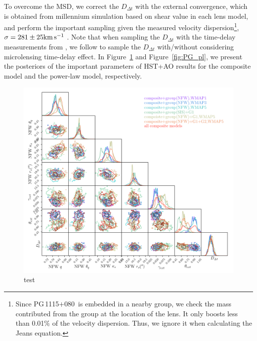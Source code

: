 \documentclass[useAMS,usenatbib]{mnras}
\newcommand\pg{PG\,1115$+$080}
\newcommand{\fref}[1]{Figure~\ref{#1}}
\def\kms {\rm km\,s^{-1}}
\newcommand{\Ddt}{{D_{\Delta t}}}
\begin{document}
To overcome the MSD, we correct the $\Ddt$ with the external convergence, which is obtained from millennium simulation based on shear value in each lens model, and perform the important sampling given the measured velocity dispersion\footnote{Since \pg~is embedded in a nearby group, we check the mass contributed from the group at the location of the lens. It only boosts less than 0.01\% of the velocity dispersion. Thus, we ignore it when calculating the Jeans equation.}, $\sigma=281\pm25\kms$ \citep{Tonry98}. 
Note that when sampling the $\Ddt$ with the time-delay measurements from \citet{BonvinEtal18}, we follow \citet{GChenEtal18a} to sample the $\Ddt$ with/without considering microlensing time-delay effect. In \fref{fig:PG_composite} and \fref{fig:PG_pl}, we present the posteriors of the important parameters of HST+AO results for the composite model and the power-law model, respectively. 
\begin{figure}
\centering
\includegraphics[scale=0.6]{PG1115_composite.png}
\caption{test}
\label{fig:PG_composite}
\end{figure}
\end{document}
